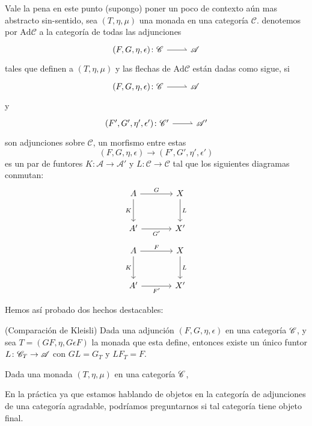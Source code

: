 \documentclass{comunicaciones}
\begin{document}
Vale la pena en este punto (supongo) poner un poco de contexto aún mas abstracto sin-sentido, sea $(T,\eta,\mu)$ una monada en una categoría $\mathscr{C}$.
denotemos por $\mathrm{Ad}\mathscr{C}$ a la categoría de todas las adjunciones
\[\begin{tikzcd}
	{(F,G,\eta,\epsilon)\colon\mathscr{C}} & {\mathscr{A}}
	\arrow[harpoon, from=1-1, to=1-2]
\end{tikzcd}\]
tales que definen a $(T,\eta,\mu)$ y las flechas de $\mathrm{Ad}\mathscr{C}$ están dadas como sigue, si 
\[\begin{tikzcd}
	{(F,G,\eta,\epsilon)\colon\mathscr{C}} & {\mathscr{A}}
	\arrow[harpoon, from=1-1, to=1-2]
\end{tikzcd}\]
y
\[\begin{tikzcd}
	{(F',G',\eta',\epsilon')\colon\mathscr{C}'} & {\mathscr{A}'}
	\arrow[harpoon, from=1-1, to=1-2]
\end{tikzcd}\]
son adjunciones sobre $\mathscr{C}$, un morfismo entre estas \[(F,G,\eta,\epsilon)\rightarrow(F',G',\eta',\epsilon')\] 
es un par de funtores $K\colon\mathscr{A}\rightarrow\mathscr{A}'$ y $L\colon\mathscr{C}\rightarrow\mathscr{C}$ tal que
los siguientes diagramas conmutan:
\[
\begin{tikzcd}[column sep=large, row sep=large]
A \arrow[r, "G"] \arrow[d, "K"'] & X \arrow[d, "L"] \\
A' \arrow[r, "G'"'] & X'
\end{tikzcd}
\]
\[
\begin{tikzcd}[column sep=large, row sep=large]
A \arrow[r, "F"] \arrow[d, "K"'] & X \arrow[d, "L"] \\
A' \arrow[r, "F'"'] & X'
\end{tikzcd}\]

Hemos así probado dos hechos destacables:

\begin{thm}(Comparación de Kleisli)\label{kleisli es final}
Dada una adjunción $(F,G,\eta,\epsilon)$ en una categoría $\EuScript{C}$, y sea $T=(GF, \eta,G\epsilon F)$ la monada que esta define,
entonces existe un único funtor $L\colon\mathscr{C}_{T}\rightarrow\EuScript{A}$ con $GL=G_{T}$ y $LF_{T}=F$.
\end{thm}


\begin{thm}\label{kleisli es final2}
Dada una monada $(T,\eta,\mu)$ en una categoría $\EuScript{C}$, 
\end{thm}


En la práctica ya que estamos hablando de objetos en la categoría de adjunciones de una categoría agradable, podríamos preguntarnos si tal categoría tiene objeto final.
\end{document}
